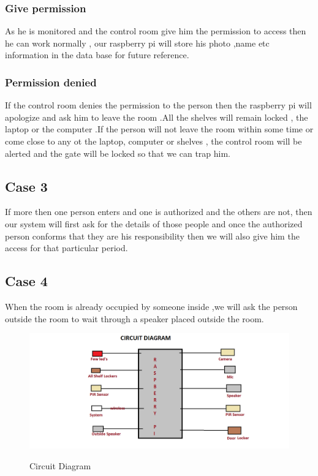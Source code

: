 \documentclass[12pt]{article}
\begin{document}
\subsubsection{Give permission}
As he is monitored and the control room give him the permission to access then he can work normally , our raspberry pi will store his photo ,name etc information in the data base for future reference.

\subsubsection{Permission denied}
If the control room denies the permission to the person then the raspberry pi will apologize and ask him to leave the room .All the shelves will remain locked , the laptop or the computer .If the person will not leave the room within some time or come close to any ot the laptop, computer or shelves , the control room will be alerted and the gate will be locked so that we can trap him.  

\subsection{Case 3}
If more then one person enters and one is authorized and the others are not, then our system will first ask for the details of those people and once the authorized person conforms that they are his responsibility then we will also give him the access for that particular period.

\subsection{Case 4}
When the room is already occupied by someone inside ,we will ask the person outside the room to wait through a speaker placed outside the room.\\[1cm] 


\begin{figure}[!h]
	\centering
	{
		\includegraphics[width=5in]{circuit_diagram.png}
	}
	\caption{Circuit Diagram}
	\label{Figure1}
\end{figure}
\end{document}
